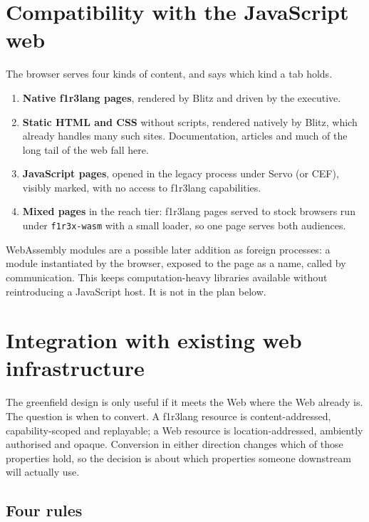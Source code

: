 \documentclass[11pt]{article}
\theoremstyle{definition}
\theoremstyle{remark}
\newcommand{\fl}{f1r3lang}
\newcommand{\code}[1]{\texttt{#1}}
\begin{document}
\section{Compatibility with the JavaScript web}\label{sec:compat}

The browser serves four kinds of content, and says which kind a tab holds.

\begin{enumerate}
\item \textbf{Native \fl{} pages}, rendered by Blitz and driven by the executive.
\item \textbf{Static HTML and CSS} without scripts, rendered natively by Blitz, which
  already handles many such sites. Documentation, articles and much of the long tail of
  the web fall here.
\item \textbf{JavaScript pages}, opened in the legacy process under Servo (or CEF),
  visibly marked, with no access to \fl{} capabilities.
\item \textbf{Mixed pages} in the reach tier: \fl{} pages served to stock browsers run
  under \code{f1r3x-wasm} with a small loader, so one page serves both audiences.
\end{enumerate}

\noindent
WebAssembly modules are a possible later addition as foreign processes: a module
instantiated by the browser, exposed to the page as a name, called by communication.
This keeps computation-heavy libraries available without reintroducing a JavaScript
host. It is not in the plan below.

\section{Integration with existing web infrastructure}\label{sec:integration}

The greenfield design is only useful if it meets the Web where the Web already is.
The question is when to convert. A \fl{} resource is content-addressed,
capability-scoped and replayable; a Web resource is location-addressed, ambiently
authorised and opaque. Conversion in either direction changes which of those
properties hold, so the decision is about which properties someone downstream will
actually use.

\subsection{Four rules}
\end{document}
